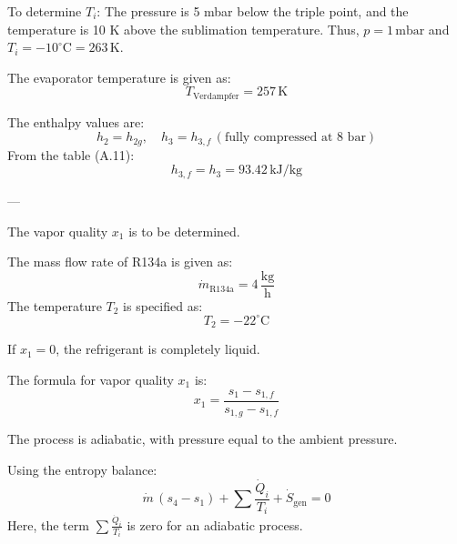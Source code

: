 To determine \( T_i \):  
The pressure is 5 mbar below the triple point, and the temperature is 10 K above the sublimation temperature.  
Thus, \( p = 1 \, \text{mbar} \) and \( T_i = -10^\circ\text{C} = 263 \, \text{K} \).  

The evaporator temperature is given as:  
\[
T_{\text{Verdampfer}} = 257 \, \text{K}
\]  

The enthalpy values are:  
\[
h_2 = h_{2g}, \quad h_3 = h_{3,f} \, (\text{fully compressed at 8 bar})
\]  
From the table (A.11):  
\[
h_{3,f} = h_3 = 93.42 \, \text{kJ/kg}
\]  

---

The vapor quality \( x_1 \) is to be determined.  

The mass flow rate of R134a is given as:  
\[
\dot{m}_{\text{R134a}} = 4 \, \frac{\text{kg}}{\text{h}}
\]  
The temperature \( T_2 \) is specified as:  
\[
T_2 = -22^\circ\text{C}
\]  

If \( x_1 = 0 \), the refrigerant is completely liquid.  

The formula for vapor quality \( x_1 \) is:  
\[
x_1 = \frac{s_1 - s_{1,f}}{s_{1,g} - s_{1,f}}
\]  

The process is adiabatic, with pressure equal to the ambient pressure.  

Using the entropy balance:  
\[
\dot{m} \, (s_4 - s_1) + \sum \frac{\dot{Q}_i}{T_i} + \dot{S}_{\text{gen}} = 0
\]  
Here, the term \(\sum \frac{\dot{Q}_i}{T_i}\) is zero for an adiabatic process.